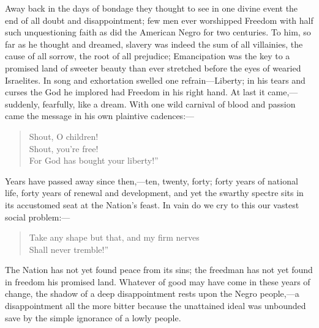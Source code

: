 Away back in the days of bondage they thought to see in one divine
event the end of all doubt and disappointment; few men ever worshipped
Freedom with half such unquestioning faith as did the American Negro
for two centuries. To him, so far as he thought and dreamed, slavery
was indeed the sum of all villainies, the cause of all sorrow, the
root of all  prejudice; Emancipation was the key to a promised
land of sweeter beauty than ever stretched before the eyes of wearied
Israelites. In song and exhortation swelled one refrain---Liberty; in
his tears and curses the God he implored had Freedom in his right
hand. At last it came,---suddenly, fearfully, like a dream. With one
wild carnival of blood and passion came the message in his own
plaintive cadences:---

\begin{verse}
Shout, O children!\\
Shout, you're free!\\
For God has bought your liberty!''
\end{verse}

Years have passed away since then,---ten, twenty, forty; forty years
of national life, forty years of renewal and development, and yet the
swarthy spectre sits in its accustomed seat at the Nation's feast. In
vain do we cry to this our vastest social problem:---

\begin{verse}
Take any shape but that, and my firm nerves\\
Shall never tremble!''
\end{verse}

The Nation has not yet found peace from its sins; the freedman has not
yet found in freedom his promised land. Whatever of good may have come
in these years of change, the shadow of a deep disappointment rests
upon the Negro people,---a disappointment all the more bitter because
the unattained ideal was unbounded save by the simple ignorance of a
lowly people.


